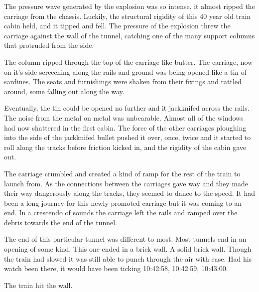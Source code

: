 The pressure wave generated by the explosion was so intense, it almost ripped the carriage from the chassis.  Luckily, the structural rigidity of this 40 year old train cabin held, and it tipped and fell.  The pressure of the explosion threw the carriage against the wall of the tunnel, catching one of the many support columns that protruded from the side.  

The column ripped through the top of the carriage like butter.  The carriage, now on it's side screeching along the rails and ground was being opened like a tin of sardines.  The seats and furnishings were shaken from their fixings and rattled around, some falling out along the way.

Eventually, the tin could be opened no further and it jackknifed across the rails.  The noise from the metal on metal was unbearable.  Almost all of the windows had now shattered in the first cabin.  The force of the other carriages ploughing into the side of the jackknifed bullet pushed it over, once, twice and it started to roll along the tracks before friction kicked in, and the rigidity of the cabin gave out.  

The carriage crumbled and created a kind of ramp for the rest of the train to launch from. As the connections between the carriages gave way and they made their way dangerously along the tracks, they seemed to dance to the speed.  It had been a long journey for this newly promoted carriage but it was coming to an end.  In a crescendo of sounds the carriage left the rails and ramped over the debris towards the end of the tunnel. 

The end of this particular tunnel was different to most.  Most tunnels end in an opening of some kind.  This one ended in a brick wall.  A solid brick wall.  Though the train had slowed it was still able to punch through the air with ease.  Had his watch been there, it would have been ticking 10:42:58, 10:42:59, 10:43:00.

The train hit the wall.



